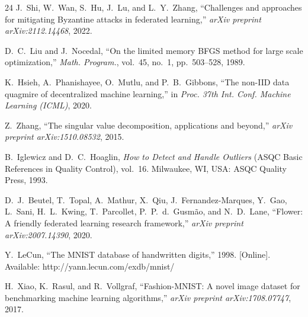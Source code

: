 \documentclass[journal]{IEEEtran}
\begin{document}
\begin{thebibliography}{24}
J.~Shi, W.~Wan, S.~Hu, J.~Lu, and L.~Y.~Zhang, ``Challenges and approaches for mitigating Byzantine attacks in federated learning,'' \textit{arXiv preprint arXiv:2112.14468}, 2022.

D.~C.~Liu and J.~Nocedal, ``On the limited memory BFGS method for large scale optimization,'' \textit{Math. Program.}, vol.~45, no.~1, pp.~503--528, 1989.

K.~Hsieh, A.~Phanishayee, O.~Mutlu, and P.~B.~Gibbons, ``The non-IID data quagmire of decentralized machine learning,'' in \textit{Proc. 37th Int. Conf. Machine Learning (ICML)}, 2020.

Z.~Zhang, ``The singular value decomposition, applications and beyond,'' \textit{arXiv preprint arXiv:1510.08532}, 2015.

B.~Iglewicz and D.~C.~Hoaglin, \textit{How to Detect and Handle Outliers} (ASQC Basic References in Quality Control), vol.~16.\hskip 1sp Milwaukee, WI, USA: ASQC Quality Press, 1993.

D.~J.~Beutel, T.~Topal, A.~Mathur, X.~Qiu, J.~Fernandez-Marques, Y.~Gao, L.~Sani, H.~L.~Kwing, T.~Parcollet, P.~P.~d.~Gusm\~{a}o, and N.~D.~Lane, ``Flower: A friendly federated learning research framework,'' \textit{arXiv preprint arXiv:2007.14390}, 2020.

Y.~LeCun, ``The MNIST database of handwritten digits,'' 1998. [Online]. Available: http://yann.lecun.com/exdb/mnist/

H.~Xiao, K.~Rasul, and R.~Vollgraf, ``Fashion-MNIST: A novel image dataset for benchmarking machine learning algorithms,'' \textit{arXiv preprint arXiv:1708.07747}, 2017.

\end{thebibliography}
\end{document}
